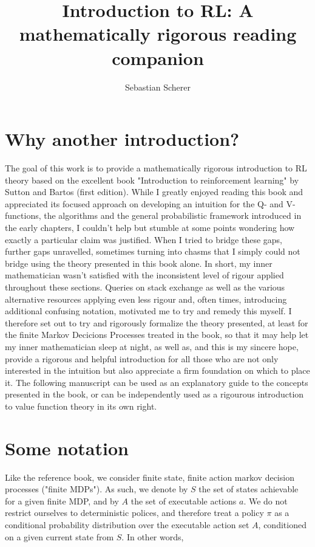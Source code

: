 \documentclass[11pt]{article} %
\title{Introduction to RL: A mathematically rigorous reading companion}
\author{Sebastian Scherer}
\begin{document}
\maketitle

\section{Why another introduction?}

The goal of this work is to provide a mathematically rigorous introduction to RL theory based on the excellent book "Introduction to reinforcement learning" by Sutton and Bartos (first edition). While I greatly enjoyed reading this book and appreciated its focused approach on developing an intuition for the Q- and V-functions, the algorithms and the general probabilistic framework introduced in the early chapters, I couldn't help but stumble at some points wondering how exactly a particular claim was justified. When I tried to bridge these gaps, further gaps unravelled, sometimes turning into chasms that I simply could not bridge using the theory presented in this book alone. In short, my inner mathematician wasn't satisfied with the inconsistent level of rigour applied throughout these sections. Queries on stack exchange as well as the various alternative resources applying even less rigour and, often times, introducing additional confusing notation, motivated me to  try and remedy this myself. I therefore set out to try and rigorously formalize the theory presented, at least for the finite Markov Decicions Processes treated in the book, so that it may help let my inner mathematician sleep at night, as well as, and this is my sincere hope, provide a rigorous and helpful introduction for all those who are not only interested in the intuition but also appreciate a firm foundation on which to place it. The following manuscript can be used as an explanatory guide to the concepts presented in the book, or can be independently used as a rigourous introduction to value function theory in its own right.

\section{Some notation}

Like the reference book, we consider finite state, finite action markov decision processes ("finite MDPs"). As such, we denote by $S$ the set of states achievable for a given finite MDP, and by $A$ the set of executable actions $a$. We do not restrict ourselves to deterministic polices, and therefore treat a policy $\pi$ as a conditional probability distribution over the executable action set $A$, conditioned on a given current state from $S$. In other words, 
\end{document}
